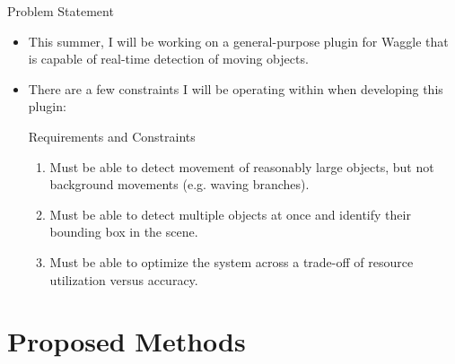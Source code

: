 \documentclass[10pt]{beamer}
\begin{document}
\begin{frame}{Problem Statement}

\begin{itemize}
\item This summer, I will be working on a general-purpose plugin for Waggle that is capable of real-time detection of moving objects.

\item There are a few constraints I will be operating within when developing this plugin:\\[4mm]

\begin{alertblock}{Requirements and Constraints}
\begin{enumerate}
\item Must be able to detect movement of reasonably large objects, but not background movements (e.g. waving branches).

\item Must be able to detect multiple objects at once and identify their bounding box in the scene.

\item Must be able to optimize the system across a \alert{trade-off of resource utilization versus accuracy}.
\end{enumerate}
\end{alertblock}

\end{itemize}
\end{frame}

\section{Proposed Methods}
\end{document}
